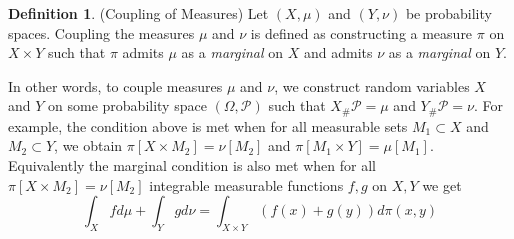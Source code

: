 \documentclass{Dissertate}
\theoremstyle{definition}
\theoremstyle{definition} %
\theoremstyle{definition}
\newtheorem{definition}[theorem]{Definition}
\begin{document}
\begin{definition} (Coupling of Measures) \cite{VillaniCedric2009Ot:o}
Let $(X, \mu)$ and $(Y, \nu)$ be probability spaces. Coupling the measures $\mu$ and $\nu$ is defined as constructing a measure $\pi$ on $X \times Y$ such that $\pi$ admits $\mu$ as a \textit{marginal} on $X$ and admits $\nu$ as a \textit{marginal} on $Y$.
\end{definition}
In other words, to couple measures $\mu$ and $\nu$, we construct random variables $X$ and $Y$ on some probability space $(\Omega, \mathcal{P})$ such that $X_{\#}\mathcal{P} = \mu$ and $Y_{\#}\mathcal{P} = \nu$. For example, the condition above is met when for all measurable sets $M_1 \subset X$ and $M_2 \subset Y$, we obtain $\pi[X \times M_2] = \nu[M_2]$ and $\pi[M_1 \times Y] = \mu[M_1]$. Equivalently the marginal condition is also met when for all $\pi[X \times M_2] = \nu[M_2]$ integrable measurable functions $f,g$ on $X,Y$ we get
$$
\int_X f d\mu + \int_Y g d\nu = \int_{X \times Y}(f(x) + g(y)) d\pi (x,y)
$$
\end{document}
